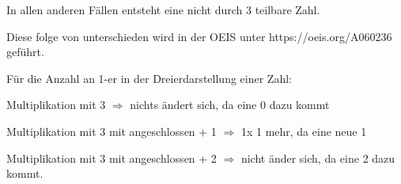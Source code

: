 \documentclass[11pt]{article}
\begin{document}
    In allen anderen Fällen entsteht eine nicht durch 3 teilbare Zahl.

    Diese folge von unterschieden wird in der OEIS unter https://oeis.org/A060236 geführt.

    \bigskip

    Für die Anzahl an 1-er in der Dreierdarstellung einer Zahl:

    Multiplikation mit 3 $\Rightarrow$ nichts ändert sich, da eine 0 dazu kommt

    Multiplikation mit 3 mit angeschlossen + 1 $\Rightarrow$ 1x 1 mehr, da eine neue 1

    Multiplikation mit 3 mit angeschlossen + 2 $\Rightarrow$ nicht änder sich, da eine 2 dazu kommt.
\end{document}

